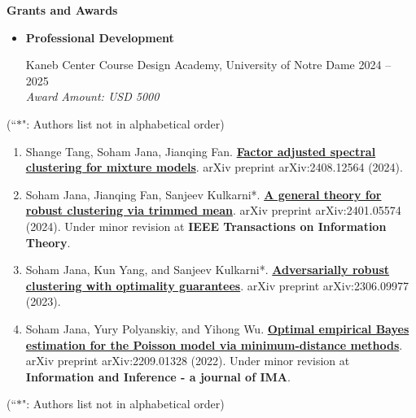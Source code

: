 \documentclass[letterpaper,12pt,oneside]{article}
\theoremstyle{definition}
\begin{document}
			\noindent \textbf{Grants and Awards}
			
			\begin{itemize}
				\item[]  \textbf{Professional Development}
				
				Kaneb Center Course Design Academy, University of Notre Dame \hfill
				2024 -- 2025\\
				{\it Award Amount: USD 5000}
			\end{itemize}
			
			
			 (``$\ast$": Authors list not in alphabetical order)
			
			\begin{enumerate}
				
				\item Shange Tang, Soham Jana, Jianqing Fan. \href{https://www.arxiv.org/abs/2408.12564}{\bf Factor adjusted spectral clustering for mixture models}. arXiv preprint arXiv:2408.12564 (2024).
				
				
				\item Soham Jana, Jianqing Fan, Sanjeev Kulkarni*. \href{https://arxiv.org/abs/2401.05574}{\bf A general theory for robust clustering via trimmed mean}. arXiv preprint arXiv:2401.05574 (2024). Under minor revision at \textbf{IEEE Transactions on Information Theory}.
				
				\item Soham Jana, Kun Yang, and Sanjeev Kulkarni*. \href{https://arxiv.org/abs/2306.09977}{\bf Adversarially robust clustering with optimality guarantees}. arXiv preprint arXiv:2306.09977 (2023).
				
				\item Soham Jana, Yury Polyanskiy, and Yihong Wu. \href{https://arxiv.org/abs/2209.01328}{\bf Optimal empirical Bayes estimation for the Poisson model via minimum-distance methods}. arXiv preprint arXiv:2209.01328 (2022). Under minor revision at \textbf{Information and Inference - a journal of IMA}.
				
				
			\end{enumerate}
			
			 (``$\ast$": Authors list not in alphabetical order)
			
\end{document}
